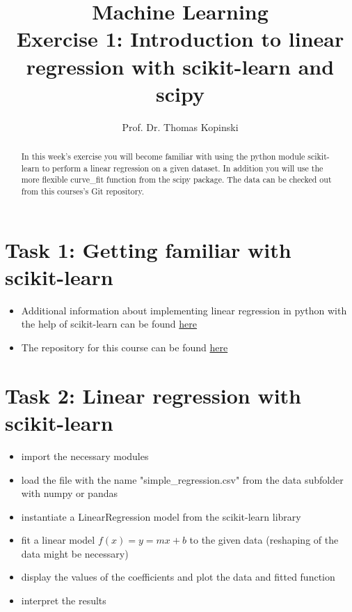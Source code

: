\documentclass{article}
\title{Machine Learning \\ Exercise 1: Introduction to linear regression with scikit-learn and scipy}
\author{Prof. Dr. Thomas Kopinski}
\begin{document}
\maketitle

\begin{abstract}
In this week's exercise you will become familiar with using the python module scikit-learn to perform a linear regression on a given dataset. In addition you will use the more flexible curve\_fit function from the scipy package. The data can be checked out from this courses's Git repository. 
\end{abstract}

\section*{Task 1: Getting familiar with scikit-learn}

\begin{itemize}
    \item Additional information about implementing linear regression in python with the help of scikit-learn can be found  \href{https://github.com/DataScienceLabFHSWF/machine-learning-book/blob/main/notebooks/ch09/ch09.ipynb}{here}
    \item The repository for this course can be found \href{https://github.com/DataScienceLabFHSWF/machine-learning-book/}{here}
\end{itemize}
\section*{Task 2: Linear regression with scikit-learn}
\begin{itemize}
    \item import the necessary modules
    \item load the file with the name "simple\_regression.csv" from the data subfolder with numpy or pandas 
    \item instantiate a LinearRegression model from the scikit-learn library
    \item fit a linear model $f(x) = y = mx+b$ to the given data (reshaping of the data might be necessary)
    \item display the values of the coefficients and plot the data and fitted function
    \item interpret the results
\end{itemize}
\end{document}
